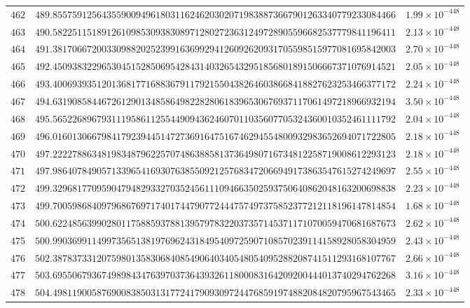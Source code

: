 \documentclass[12pt,reqno]{amsart}
\theoremstyle{remark}
\begin{document}
\begin{longtable}{clc}
$462$ & $489.8557591256435590094961803116246203020719838873667901263340779233084466$ & $1.99\times 10^{-448}$ \\
$463$ & $490.5822511518912610985309383089712802723631249728905596682537779841196411$ & $2.13\times 10^{-448}$ \\
$464$ & $491.3817066720033098820252399163699294126092620931705598515977081695842003$ & $2.70\times 10^{-448}$ \\
$465$ & $492.4509383229653045152850695428431403265432951856801891506667371076914521$ & $2.05\times 10^{-448}$ \\
$466$ & $493.4006939351201368177168836791179215504382646038668418827623253466377172$ & $2.24\times 10^{-448}$ \\
$467$ & $494.6319085844672612901348586498228280618396530676937117061497218966932194$ & $3.50\times 10^{-448}$ \\
$468$ & $495.5652268967931119586112554490943624607011035607705324360010352461111792$ & $2.04\times 10^{-448}$ \\
$469$ & $496.0160130667984179239445147273691647516746294554800932983652694071722805$ & $2.18\times 10^{-448}$ \\
$470$ & $497.2222788634819834879622570748638858137364980716734812258719008612293123$ & $2.18\times 10^{-448}$ \\
$471$ & $497.9864078490571339654169307638550921257683472066949173863547615274249697$ & $2.55\times 10^{-448}$ \\
$472$ & $499.3296817709590479482933270352456111094663502593750640862048163200698838$ & $2.23\times 10^{-448}$ \\
$473$ & $499.7005986840979686769717401744790772444757497375852377212118196147814854$ & $1.68\times 10^{-448}$ \\
$474$ & $500.6224856399028011758859378813957978322037357145371171070059470681687673$ & $2.62\times 10^{-448}$ \\
$475$ & $500.9903699114997356513819769624318495409725907108570239114158928058304959$ & $2.43\times 10^{-448}$ \\
$476$ & $502.3878373312075980135830684085490640340548054095288208741511293168107767$ & $2.66\times 10^{-448}$ \\
$477$ & $503.6955067936749898434763970373643932611800083164209200444013740294762268$ & $3.16\times 10^{-448}$ \\
$478$ & $504.4981190058769008385031317724179093097244768591974882084820795967543465$ & $2.33\times 10^{-448}$ \\

\end{longtable}
\end{document}
